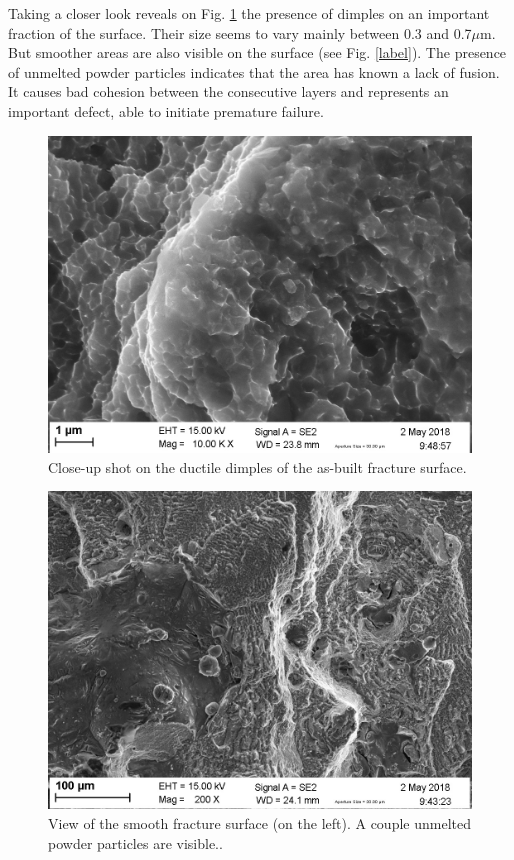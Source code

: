 Taking a closer look reveals on Fig. \ref{fig:ms_ab_frac3} the presence of dimples on an important fraction of the surface. Their size seems to vary mainly between 0.3 and 0.7$\mu$m. But smoother areas are also visible on the surface (see Fig. \ref{label}). The presence of unmelted powder particles indicates that the area has known a lack of fusion. It causes bad cohesion between the consecutive layers and represents an important defect, able to initiate premature failure.

\begin{figure}[ht]
	\centering
	\centerline{\includegraphics[scale=0.35]{Images/frac-01-09.jpg}}
	\decoRule
	\caption[Close-up shot on the ductile dimples of the as-built fracture surface]{Close-up shot on the ductile dimples of the as-built fracture surface.}
	\label{fig:ms_ab_frac3}
\end{figure}

\begin{figure}[ht]
	\centering
	\centerline{\includegraphics[scale=0.35]{Images/frac-01-07.jpg}}
	\decoRule
	\caption[View of the smooth fracture surface (on the left). A couple unmelted powder particles are visible.]{View of the smooth fracture surface (on the left). A couple unmelted powder particles are visible..}
	\label{fig:ms_ab_frac4}
\end{figure}

